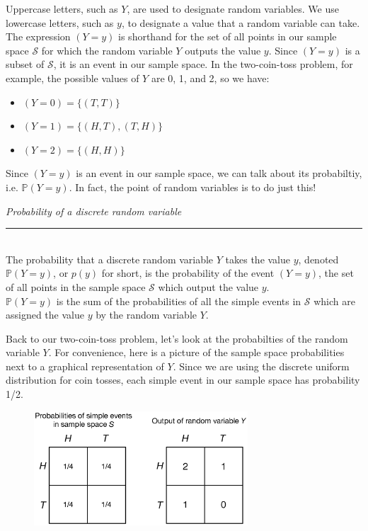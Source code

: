 \documentclass[12pt]{article}
\theoremstyle{definition}
\theoremstyle{remark}
\def\P{{\mathbb P}}
\def\cals{{\mathcal S}}
\begin{document}
Uppercase letters, such as $Y$, are used to designate random variables. We use lowercase letters, such as $y$, to designate a value that a random variable can take. The expression $(Y = y)$ is shorthand for the set of all points in our sample space $\cals$ for which the random variable $Y$ outputs the value $y$. Since $(Y = y)$ is a subset of $\cals$, it is an event in our sample space. In the two-coin-toss problem, for example, the possible values of $Y$ are 0, 1, and 2, so we have:
\begin{itemize}[noitemsep]
\item $(Y = 0) = \{ (T, T) \}$
\item $(Y = 1) = \{ (H, T), (T, H) \}$
\item $(Y = 2) = \{ (H, H) \}$
\end{itemize}

Since $(Y = y)$ is an event in our sample space, we can talk about its probabiltiy, i.e. $\P(Y = y)$. In fact, the point of random variables is to do just this! 

\begin{framed}
  \emph{Probability of a discrete random variable }\\
  \rule{\dimexpr{}\fboxrule}{.1pt} \\
  The probability that a discrete random variable $Y$ takes the value $y$, denoted $\P(Y = y)$, or $p(y)$ for short, is the probability of the event $(Y = y)$, the set of all points in the sample space $\cals$ which output the value $y$. \\

  $\P(Y = y)$ is the sum of the probabilities of all the simple events in $\cals$ which are assigned the value $y$ by the random variable $Y$.
\end{framed}

Back to our two-coin-toss problem, let's look at the probabilties of the random variable $Y$. For convenience, here is a picture of the sample space probabilities next to a graphical representation of $Y$. Since we are using the discrete uniform distribution for coin tosses, each simple event in our sample space has probability 1/2.
\begin{figure}[H]
\centering
\includegraphics[width=8cm]{numberofheads2.eps}
\end{figure}
\end{document}
